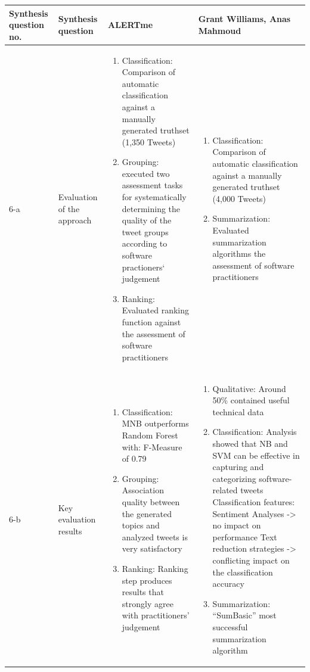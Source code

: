 \documentclass[a4paper,10pt, bibliography=totocnumbered]{scrreprt}
\begin{document}
\begin{center}
\begin{tabular}{ | m{4em} | m{}| m{5cm} | m{5cm} | } 
  \hline
  Synthesis question no. & Synthesis question & ALERTme & Grant Williams, Anas Mahmoud \\ 
  \hline
    6-a & Evaluation of the approach & \begin{enumerate}
    \item Classification: Comparison of automatic classification against a manually generated truthset (1,350 Tweets)
    \item Grouping: executed two assessment tasks for systematically determining the quality of the tweet groups according to software practioners` judgement 
    \item Ranking: Evaluated ranking function against the assessment of software practitioners 
\end{enumerate} & \begin{enumerate}
    \item Classification: Comparison of automatic classification against a manually generated truthset (4,000 Tweets)
    \item Summarization: Evaluated summarization algorithms the assessment of software practitioners
\end{enumerate} \\ 
  \hline
    6-b & Key evaluation results & \begin{enumerate}
    \item Classification: MNB outperforms Random Forest with: F-Measure of 0.79 
    \item Grouping: Association quality between the generated topics and analyzed tweets is very satisfactory

    \item Ranking: Ranking step produces results that strongly agree with practitioners' judgement 
\end{enumerate} & \begin{enumerate}
    \item Qualitative: Around 50\% contained useful technical data
    \item Classification: Analysis showed that NB and SVM can be effective in capturing and categorizing software-related tweets
    Classification features: 
    Sentiment Analyses -> no impact on performance
    Text reduction strategies -> conflicting impact on the classification accuracy

    \item Summarization: “SumBasic” most successful summarization algorithm
\end{enumerate} \\ 
  \hline
\end{tabular}
\end{center}
\label{chap:5}
\end{document}
